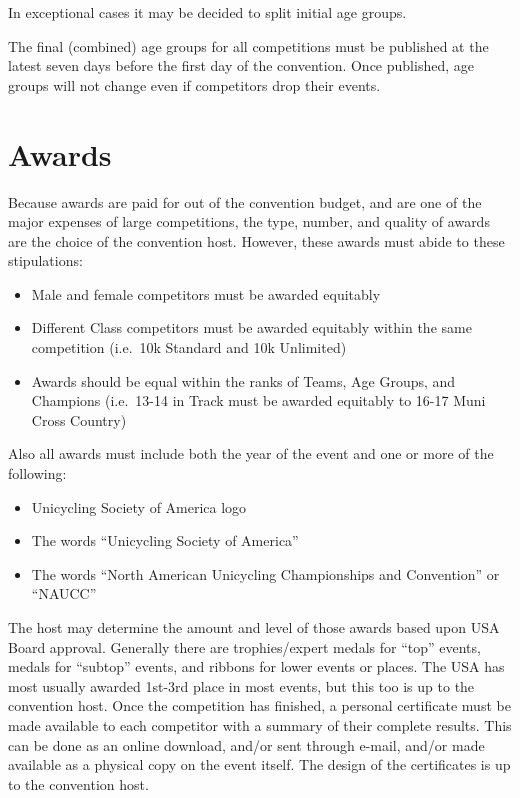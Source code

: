 In exceptional cases it may be decided to split initial age groups.

The final (combined) age groups for all competitions must be published at the latest seven days before the first day of the convention.
Once published, age groups will not change even if competitors drop their events.

\section{Awards}

Because awards are paid for out of the convention budget, and are one of the major expenses of large competitions, the type, number, and quality of awards are the choice of the convention host.
However, these awards must abide to these stipulations:
\begin{itemize}
\item Male and female competitors must be awarded equitably
\item Different Class competitors must be awarded equitably within the same competition (i.e.\ 10k Standard and 10k Unlimited)
\item Awards should be equal within the ranks of Teams, Age Groups, and Champions (i.e.\ 13-14 in Track must be awarded equitably to 16-17 Muni Cross Country)
\end{itemize}

Also all awards must include both the year of the event and one or more of the following:
\begin{itemize}
\item Unicycling Society of America logo
\item The words ``Unicycling Society of America''
\item The words ``North American Unicycling Championships and Convention'' or ``NAUCC''
 \end{itemize}

 The host may determine the amount and level of those awards based upon USA Board approval.
 Generally there are trophies/expert medals for ``top'' events, medals for ``subtop'' events, and ribbons for lower events or places.
 The USA has most usually awarded 1st-3rd place in most events, but this too is up to the convention host.
Once the competition has finished, a personal certificate must be made available to each competitor with a summary of their complete results.
This can be done as an online download, and/or sent through e-mail, and/or made available as a physical copy on the event itself.
The design of the certificates is up to the convention host.

